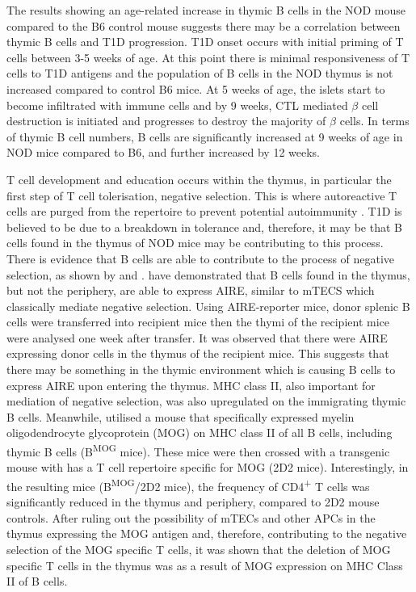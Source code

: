 The results showing an age-related increase in thymic B cells in the NOD mouse compared to the B6 control mouse suggests there may be a correlation between thymic B cells and T1D progression.
T1D onset occurs with initial priming of T cells between 3-5 weeks of age. 
At this point there is minimal responsiveness of T cells to T1D antigens and the population of B cells in the NOD thymus is not increased compared to control B6 mice.
At 5 weeks of age, the islets start to become infiltrated with immune cells and by 9 weeks, CTL mediated $\beta$ cell destruction is initiated and progresses to destroy the majority of $\beta$ cells.
In terms of thymic B cell numbers, B cells are significantly increased at 9 weeks of age in NOD mice compared to B6, and further increased by 12 weeks.


T cell development and education occurs within the thymus, in particular the first step of T cell tolerisation, negative selection.
This is where autoreactive T cells are purged from the repertoire to prevent potential autoimmunity \citep{Hogquist2005}.
T1D is believed to be due to a breakdown in tolerance and, therefore, it may be that B cells found in the thymus of NOD mice may be contributing to this process.
There is evidence that B cells are able to contribute to the process of negative selection, as shown by \citet{Frommer2010} and \citet{Yamano2015}.
\citet{Yamano2015} have demonstrated that B cells found in the thymus, but not the periphery, are able to express AIRE, similar to mTECS which classically mediate negative selection.
Using AIRE-reporter mice, donor splenic B cells were transferred into recipient mice then the thymi of the recipient mice were analysed one week after transfer.
It was observed that there were AIRE expressing donor cells in the thymus of the recipient mice.
This suggests that there may be something in the thymic environment which is causing B cells to express AIRE upon entering the thymus.
MHC class II, also important for mediation of negative selection, was also upregulated on the immigrating thymic B cells.
Meanwhile, \citet{Frommer2010} utilised a mouse that specifically expressed myelin oligodendrocyte glycoprotein (MOG) on MHC class II of all B cells, including thymic B cells (B\textsuperscript{MOG} mice). 
These mice were then crossed with a transgenic mouse with has a T cell repertoire specific for MOG (2D2 mice).
Interestingly, in the resulting mice (B\textsuperscript{MOG}/2D2 mice), the frequency of CD4\textsuperscript{+} T cells was significantly reduced in the thymus and periphery, compared to 2D2 mouse controls.
After ruling out the possibility of mTECs and other APCs in the thymus expressing the MOG antigen and, therefore, contributing to the negative selection of the MOG specific T cells, it was shown that the deletion of MOG specific T cells in the thymus was as a result of MOG expression on MHC Class II of B cells. 

